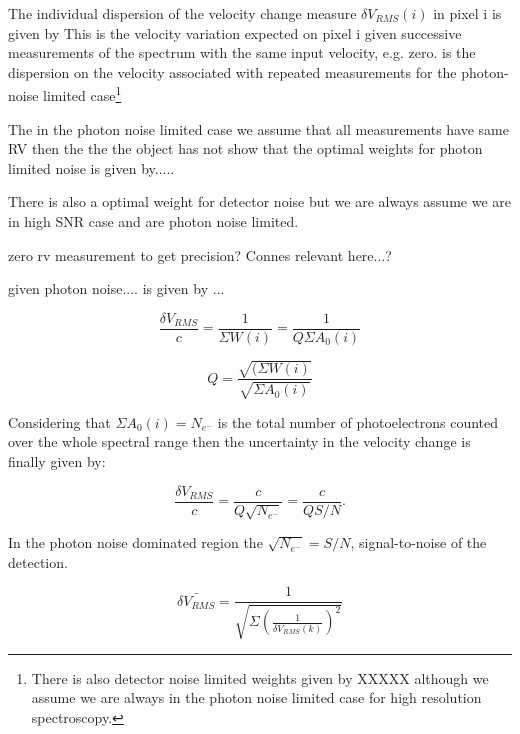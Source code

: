 The individual dispersion of the velocity change measure $\delta V_{RMS}(i)$ in pixel i is given by This is the velocity variation expected on pixel i given successive measurements of the spectrum with the same input velocity, e.g. zero.
 is the dispersion on the velocity associated with repeated measurements 
 for the photon-noise limited case\footnote{There is also detector noise limited weights given by XXXXX although we assume we are always in the photon noise limited case for high resolution spectroscopy.} 
 
The in the photon noise limited case we assume that all measurements have same RV then the the the object has not 
\citet{Connes1985} show that the optimal weights for photon limited noise is given by.....

There is also a optimal weight for detector noise but we are always assume we are in high SNR case and are photon noise limited.

 zero rv measurement to get precision? Connes relevant here...?



given photon noise.... is given by \citet{Connes1985}... 


\begin{equation}
    \frac{\delta V_{RMS}}{c} = \frac{1}{\Sigma {W(i)}} = \frac{1}{Q \Sigma {A_0(i)}}
\end{equation}

\begin{equation}
Q = \frac{\sqrt{(\Sigma{W(i)}}}{\sqrt{\Sigma{A_0(i)}}}
\end{equation}

Considering that \(\Sigma{A_0(i)} = N_{e^-} \) is the total number of photoelectrons counted over the whole spectral range then the uncertainty in the velocity change is finally given by:

\begin{equation}
\frac{\delta V_{RMS}}{c} = \frac{c}{Q \sqrt{N_{e^-}}} = \frac{c}{Q S/N}.
\end{equation}

In the photon noise dominated region the \(\sqrt{N_{e^-}} = S/N\), signal-to-noise of the detection.  


\begin{equation}
\bar{\delta V_{RMS}} = \frac{1}{\sqrt{\Sigma{(\frac{1}{\delta V_{RMS}(k)})^2}}}
\end{equation}



